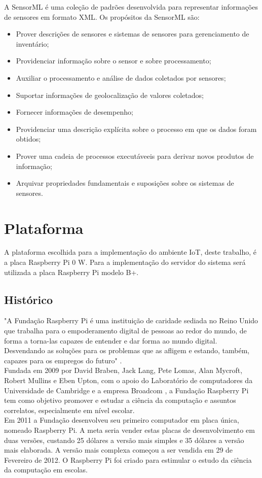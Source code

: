      \quad A \acrfull{SensorML} \cite{SML} é uma coleção de padrões
    desenvolvida para representar informações de sensores em formato XML. Os propósitos da \acrshort{SensorML} são:
    \begin{itemize}
      \item Prover descrições de sensores e sistemas de sensores para gerenciamento de inventário;
      \item Providenciar informação sobre o sensor e sobre processamento;
      \item Auxiliar o processamento e análise de dados coletados por sensores;
      \item Suportar informações de geolocalização de valores coletados;
      \item Fornecer informações de desempenho;
      \item Providenciar uma descrição explícita sobre o processo em que os dados foram obtidos;
      \item Prover uma cadeia de processos executáveeis para derivar novos produtos de informação;
      \item Arquivar propriedades fundamentais e suposições sobre os sistemas de sensores.
    \end{itemize}
\section{Plataforma}
\quad A plataforma escolhida para a implementação do ambiente \acrlong{IoT}, deste trabalho, é a placa Raspberry Pi 0 W. Para a implementação do servidor do sistema
será utilizada a placa Raspberry Pi modelo B+.
\subsection{Histórico}
\quad "A Fundação Raspberry Pi é uma instituição de caridade sediada no Reino Unido que trabalha para o empoderamento digital de pessoas ao redor do mundo,
de forma a torna-las capazes de entender e dar forma ao mundo digital. Desvendando as soluções para os
problemas que as afligem e estando, também, capazes para os empregos do futuro" \cite{rasp}.\\\null
\quad Fundada em 2009 por David Braben, Jack Lang, Pete Lomas, Alan Mycroft, Robert Mullins e Eben Upton, com o apoio do Laboratório de computadores da Universidade de Cambridge e a empresa Broadcom
, a Fundação Raspberry Pi tem como objetivo promover e estudar a ciência da computação e assuntos correlatos, especialmente em nível escolar.
\\\null \quad Em 2011 a Fundação desenvolveu seu primeiro computador em placa única, nomeado Raspberry Pi. A meta seria vender estas placas
de desenvolvimento em duas versões, custando 25 dólares a versão mais simples e 35 dólares a versão mais elaborada. A versão mais complexa começou a ser vendida
em 29 de Fevereiro de 2012. O Raspberry Pi foi criado para estimular o estudo da ciência da computação em escolas.
